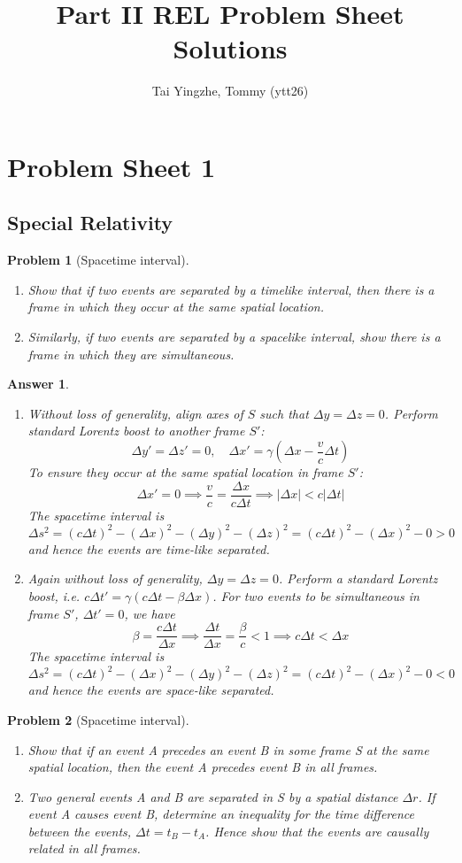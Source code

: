 \documentclass[a4paper]{article}
\title{\textbf{Part II REL Problem Sheet Solutions}}
\author{Tai Yingzhe, Tommy (ytt26)}
\date{}
\newtheorem{ans}{Answer}[subsection]
\theoremstyle{new}
\newtheorem{qns}{Problem}[section]
\begin{document}
\maketitle
\tableofcontents
\newpage
\section{Problem Sheet 1}
\subsection*{Special Relativity}
\begin{qns}[Spacetime interval]\leavevmode
\begin{enumerate}[label=(\alph*)]
\item Show that if two events are separated by a timelike interval, then there is a frame in which they occur at the same spatial location.
\item Similarly, if two events are separated by a spacelike interval, show there is a frame in which they are simultaneous.
\end{enumerate}
\end{qns}
\begin{ans}\leavevmode
\begin{enumerate}[label=(\alph*)]
\item Without loss of generality, align axes of $S$ such that $\Delta y=\Delta z=0$. Perform standard Lorentz boost to another frame $S'$:
$$\Delta y'=\Delta z'=0,\quad\Delta x'=\gamma(\Delta x-\frac{v}{c}\Delta t)$$
To ensure they occur at the same spatial location in frame $S'$:
$$\Delta x'=0\implies\frac{v}{c}=\frac{\Delta x}{c\Delta t}\implies|\Delta x|<c|\Delta t|$$
The spacetime interval is
$$\Delta s^2=(c\Delta t)^2-(\Delta x)^2-(\Delta y)^2-(\Delta z)^2=(c\Delta t)^2-(\Delta x)^2-0>0$$
and hence the events are time-like separated.
\item Again without loss of generality, $\Delta y=\Delta z=0$. Perform a standard Lorentz boost, i.e. $c\Delta t'=\gamma(c\Delta t-\beta\Delta x)$. For two events to be simultaneous in frame $S'$, $\Delta t'=0$, we have $$\beta=\frac{c\Delta t}{\Delta x}\implies\frac{\Delta t}{\Delta x}=\frac{\beta}{c}<1\implies c\Delta t<\Delta x$$
The spacetime interval is
$$\Delta s^2=(c\Delta t)^2-(\Delta x)^2-(\Delta y)^2-(\Delta z)^2=(c\Delta t)^2-(\Delta x)^2-0<0$$
and hence the events are space-like separated.
\end{enumerate}
\end{ans}
\begin{qns}[Spacetime interval]\leavevmode
\begin{enumerate}[label=(\alph*)]
\item Show that if an event A precedes an event B in some frame S at the same spatial location, then the event A precedes event B in all frames. 
\item Two general events A and B are separated in S by a spatial distance $\Delta r$. If event A causes event B, determine an inequality for the time difference between the events, $\Delta t=t_B-t_A$. Hence show that the events are causally related in all frames.
\end{enumerate}
\end{qns}
\end{document}

